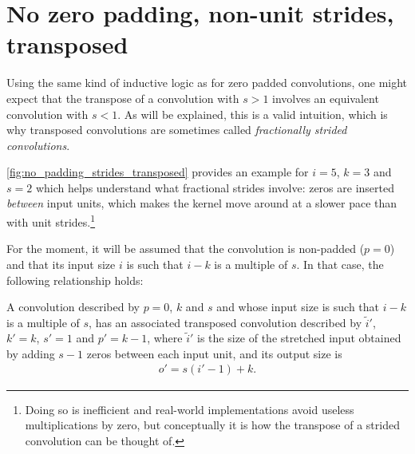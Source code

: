 \section{No zero padding, non-unit strides, transposed}

Using the same kind of inductive logic as for zero padded convolutions, one
might expect that the transpose of a convolution with $s > 1$ involves an
equivalent convolution with $s < 1$. As will be explained, this is a valid
intuition, which is why transposed convolutions are sometimes called {\em
fractionally strided convolutions}.

\autoref{fig:no_padding_strides_transposed} provides an example for $i = 5$, $k
= 3$ and $s = 2$ which helps understand what fractional strides involve: zeros
are inserted {\em between\/} input units, which makes the kernel move around at
a slower pace than with unit strides.\footnote{Doing so is inefficient and
    real-world implementations avoid useless multiplications by zero, but
    conceptually it is how the transpose of a strided convolution can be
    thought of.}

For the moment, it will be assumed that the convolution is non-padded ($p = 0$)
and that its input size $i$ is such that $i - k$ is a multiple of $s$. In that
case, the following relationship holds:

\begin{relationship}\label{rel:no_padding_strides_transposed}
A convolution described by $p = 0$, $k$ and $s$ and whose input
size is such that $i - k$ is a multiple of $s$, has an associated transposed
convolution described by $\tilde{i}'$, $k' = k$, $s' = 1$ and $p' = k - 1$,
where $\tilde{i}'$ is the size of the stretched input obtained by adding
$s - 1$ zeros between each input unit, and its output size is
\begin{equation*}
\begin{split}
    o' = s (i' - 1) + k.
\end{split}
\end{equation*}
\end{relationship}

